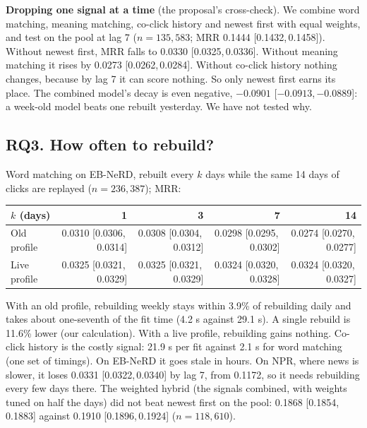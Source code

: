 \documentclass[11pt,a4paper]{article}
\newcommand{\ci}[2]{[#1,\,#2]}
\begin{document}
\textbf{Dropping one signal at a time} (the proposal's cross-check). We combine word matching, meaning matching, co-click history and newest first with equal weights, and test on the pool at lag 7 ($n=135{,}583$; MRR 0.1444 \ci{0.1432}{0.1458}). Without newest first, MRR falls to 0.0330 \ci{0.0325}{0.0336}. Without meaning matching it rises by 0.0273 \ci{0.0262}{0.0284}. Without co-click history nothing changes, because by lag 7 it can score nothing. So only newest first earns its place. The combined model's decay is even negative, $-0.0901$ \ci{$-0.0913$}{$-0.0889$}: a week-old model beats one rebuilt yesterday. We have not tested why.

\subsection{RQ3. How often to rebuild?}
Word matching on EB-NeRD, rebuilt every $k$ days while the same 14 days of clicks are replayed ($n=236{,}387$); MRR:
\begin{center}\small
\setlength{\tabcolsep}{4pt}
\begin{tabular}{@{}lrrrr@{}}
\toprule
$k$ (days) & 1 & 3 & 7 & 14\\
\midrule
Old profile & 0.0310 \ci{0.0306}{0.0314} & 0.0308 \ci{0.0304}{0.0312} & 0.0298 \ci{0.0295}{0.0302} & 0.0274 \ci{0.0270}{0.0277}\\
Live profile & 0.0325 \ci{0.0321}{0.0329} & 0.0325 \ci{0.0321}{0.0329} & 0.0324 \ci{0.0320}{0.0328} & 0.0324 \ci{0.0320}{0.0327}\\
\bottomrule
\end{tabular}
\end{center}
With an old profile, rebuilding weekly stays within 3.9\% of rebuilding daily and takes about one-seventh of the fit time (4.2 s against 29.1 s). A single rebuild is 11.6\% lower (our calculation). With a live profile, rebuilding gains nothing. Co-click history is the costly signal: 21.9 s per fit against 2.1 s for word matching (one set of timings). On EB-NeRD it goes stale in hours. On NPR, where news is slower, it loses 0.0331 \ci{0.0322}{0.0340} by lag 7, from 0.1172, so it needs rebuilding every few days there. The weighted hybrid (the signals combined, with weights tuned on half the days) did not beat newest first on the pool: 0.1868 \ci{0.1854}{0.1883} against 0.1910 \ci{0.1896}{0.1924} ($n=118{,}610$).
\end{document}
